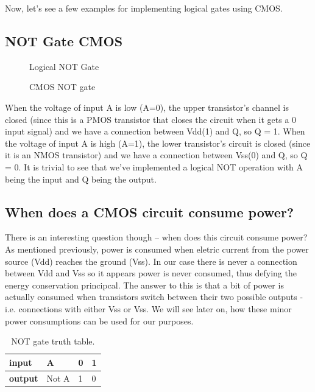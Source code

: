 Now, let's see a few examples for implementing logical gates using CMOS.

\subsection{NOT Gate CMOS}

\begin{figure}[!ht]
    \centering
    
    \caption{Logical NOT Gate} \label{fig:not}
\end{figure}


\begin{figure}[!ht]
    \centering
    
    \caption{CMOS NOT gate} \label{fig:circuit9}
\end{figure}

When the voltage of input A is low (A=0), the upper
transistor's channel is closed (since this is a PMOS transistor that closes the circuit when it gets a 0 input signal) and we have a connection between Vdd(1) and Q, so
Q = 1. When the voltage of input A is high (A=1),
the lower transistor's circuit is closed (since it is an NMOS transistor) and we have a connection between Vss(0)
and Q, so Q = 0. It is trivial to see that we've implemented a logical NOT operation with A being the input and Q being the output.

\subsection{When does a CMOS circuit consume power?}

There is an interesting question though – when does this circuit consume power? As mentioned previously, power is consumed when eletric current from the power source (Vdd) reaches the ground (Vss). In our case there is never a connection between Vdd and Vss so it appears power is never consumed, thus defying the energy conservation principcal. The answer to this is that a bit of power is actually consumed when transistors switch between their two possible outputs - i.e. connections with either Vss or Vss. We will see later on, how these minor power consumptions can be used for our purposes.

\begin{table}
    \centering
    \caption{NOT gate truth table.}
    \begin{tabular}{llll}
        \toprule
        \textbf{input}  & A     & 0 & 1 \\ \midrule \textbf{output} & Not A & 1
        & 0 \\ \bottomrule
    \end{tabular}
\end{table} 

